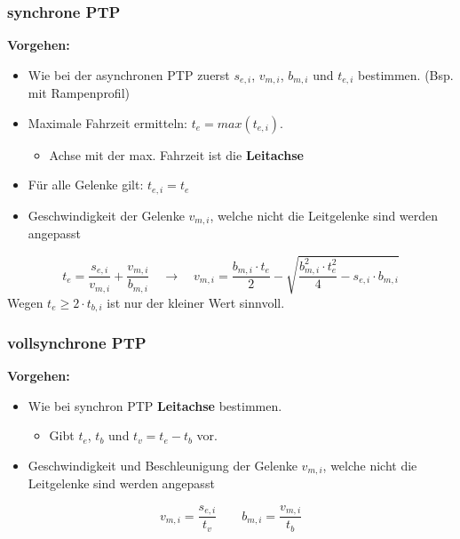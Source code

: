 \subsubsection{synchrone PTP }
\textbf{Vorgehen:}\newline \vspace{-\baselineskip}
\begin{itemize}
    \item Wie bei der asynchronen PTP zuerst $s_{e,i}$, $ v_{m,i}$, $b_{m,i}$ und $t_{e,i}$ bestimmen. (Bsp. mit Rampenprofil)
    \item Maximale Fahrzeit ermitteln: $t_e=max(t_{e,i})$.
    \begin{itemize}
        \item Achse mit der max. Fahrzeit ist die \textbf{Leitachse}
    \end{itemize} 
    \item Für alle Gelenke gilt: $t_{e,i}=t_e$
    \item Geschwindigkeit der Gelenke $v_{m,i}$, welche nicht die Leitgelenke sind werden angepasst
\end{itemize}
\[ t_e=\frac{s_{e,i}}{v_{m,i}}+\frac{v_{m,i}}{b_{m,i}}  \quad \rightarrow \quad 
 v_{m,i}=\frac{b_{m,i}\cdot t_e}{2}- \sqrt{\frac{b_{m,i}^2\cdot t_e^2}{4}-s_{e,i}\cdot b_{m,i}} \]
Wegen $t_e \ge 2\cdot t_{b,i}$ ist nur der kleiner Wert sinnvoll.
\subsubsection{vollsynchrone PTP }
\textbf{Vorgehen:}\newline \vspace{-\baselineskip}
\begin{itemize}
    \item Wie bei synchron PTP \textbf{Leitachse} bestimmen.
    \begin{itemize}
        \item Gibt $t_e$, $t_b$ und $t_v=t_e-t_b $ vor.
    \end{itemize}
    \item Geschwindigkeit und Beschleunigung der Gelenke $v_{m,i}$, welche nicht die Leitgelenke sind werden angepasst
\end{itemize}    
\[ v_{m,i}= \frac{s_{e,i}}{t_v} \qquad b_{m,i}=\frac{v_{m,i}}{t_b} \]

